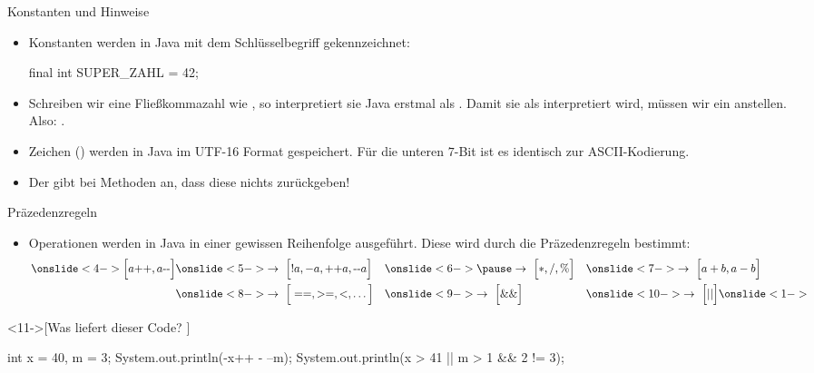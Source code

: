 \begin{frame}[fragile]{Konstanten und Hinweise}
    \begin{itemize}[<+(1)->]
        \widei
        \item Konstanten werden in Java mit dem Schlüsselbegriff  gekennzeichnet: \begin{plainjava}
final int SUPER_ZAHL = 42;
        \end{plainjava}
        \item Schreiben wir eine Fließkommazahl wie , so interpretiert sie Java erstmal als .\pause{} Damit sie als  interpretiert wird, müssen wir ein  anstellen.\pause{} Also: .
        \item Zeichen () werden in Java im UTF-16 Format gespeichert.\pause{} Für die unteren \(7\)-Bit ist es identisch zur ASCII-Kodierung.
        \item Der   gibt bei Methoden an,\pause{} dass diese nichts zurückgeben!
    \end{itemize}
\end{frame}

\begin{frame}[fragile]{Präzedenzregeln}
    \begin{itemize}[<+(1)->]
        \widei
        \item Operationen werden in Java in einer gewissen Reihenfolge ausgeführt.\pause{} Diese wird durch die Präzedenzregeln bestimmt:
        \begin{alignat*}{3}
            \onslide<4->{\Big[a\text{++},a\text{-\!\! -}\Big]}&\onslide<5->{\to~\Big[!a, -a, \text{++}a,\text{-\!\! -}a\Big]}&&\onslide<6->{\pause\to~\Big[*,/,\%\Big]} &&\onslide<7->{\to~\Big[a+b,a-b\Big]}\\
            &\onslide<8->{\to~\Big[==,>=,<,\ldots\Big]} &&\onslide<9->{\to~\Big[\&\&\Big]}&&\onslide<10->{\to~\Big[||\Big]}\onslide<1->
        \end{alignat*}
        \vspace*{-0.5cm}
    \end{itemize}
\ifull
    \begin{exercise}<11->[Was liefert dieser Code? ]
        \begin{plainjava}[columns={[c]fullflexible}]
int x = 40, m = 3;
System.out.println(-x++ - --m);
System.out.println(x > 41 || m > 1 && 2 != 3);
        \end{plainjava}
    \end{exercise}
    \fi{}
\end{frame}

